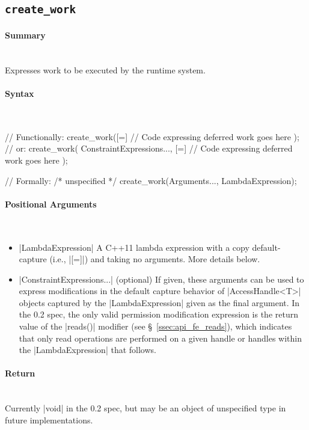 \subsection{\texttt{create\_work}}
\label{ssec:api_fe_cw}

\paragraph{Summary}\mbox{}\\
Expresses work to be executed by the runtime system.

\paragraph{Syntax}\mbox{}\\
\begin{CppCode}
// Functionally:
create_work([=]{
  // Code expressing deferred work goes here
});
// or:
create_work(
  ConstraintExpressions..., 
  [=]{
    // Code expressing deferred work goes here
  }
);

// Formally:
/* unspecified */ create_work(Arguments..., LambdaExpression);
\end{CppCode}


\paragraph{Positional Arguments}\mbox{}\\
\begin{itemize}
  \item |LambdaExpression| A C++11 lambda expression with a copy
  default-capture (i.e., |[=]|) and taking no arguments.  More details
  below.
  \item |ConstraintExpressions...| (optional) If given, these
  arguments can be used to express modifications in the default capture behavior
  of |AccessHandle<T>| objects captured by the |LambdaExpression|
  given as the final argument.  In the 0.2 spec, the only valid permission
  modification expression is the return value of the |reads()| modifier
  (see \S~\ref{ssec:api_fe_reads}), which indicates that only read operations
  are performed on a given handle or handles within the
  |LambdaExpression| that follows.
\end{itemize}


\paragraph{Return}\mbox{}\\
Currently |void| in the 0.2 spec, but may be an object of unspecified
type in future implementations.

